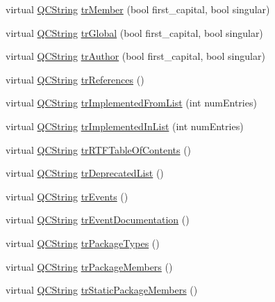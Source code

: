 \begin{DoxyCompactItemize}
\item 
virtual \hyperlink{class_q_c_string}{Q\-C\-String} \hyperlink{class_translator_portuguese_aaded5c915d8cd335abcd0e65e535cd71}{tr\-Member} (bool first\-\_\-capital, bool singular)
\item 
virtual \hyperlink{class_q_c_string}{Q\-C\-String} \hyperlink{class_translator_portuguese_ac9f8f800abe2f721d9cf0bdfc9b6ec6f}{tr\-Global} (bool first\-\_\-capital, bool singular)
\item 
virtual \hyperlink{class_q_c_string}{Q\-C\-String} \hyperlink{class_translator_portuguese_a8ce93b65c315fc4e942a1dc4cc80fa54}{tr\-Author} (bool first\-\_\-capital, bool singular)
\item 
virtual \hyperlink{class_q_c_string}{Q\-C\-String} \hyperlink{class_translator_portuguese_a54eaa9a933568bfd7eaffe36b7872eb0}{tr\-References} ()
\item 
virtual \hyperlink{class_q_c_string}{Q\-C\-String} \hyperlink{class_translator_portuguese_a01f548ba9f63fd42bc070ba1247e6543}{tr\-Implemented\-From\-List} (int num\-Entries)
\item 
virtual \hyperlink{class_q_c_string}{Q\-C\-String} \hyperlink{class_translator_portuguese_aa2aa7d2d195ce999a256e7769605c0f0}{tr\-Implemented\-In\-List} (int num\-Entries)
\item 
virtual \hyperlink{class_q_c_string}{Q\-C\-String} \hyperlink{class_translator_portuguese_aacd8ff5b2dcf79f4e8e72625d624a206}{tr\-R\-T\-F\-Table\-Of\-Contents} ()
\item 
virtual \hyperlink{class_q_c_string}{Q\-C\-String} \hyperlink{class_translator_portuguese_af7a7f1e3eaf6bc4c1026cfb73fbf486a}{tr\-Deprecated\-List} ()
\item 
virtual \hyperlink{class_q_c_string}{Q\-C\-String} \hyperlink{class_translator_portuguese_a43ec7331f50b74dc31b6d4e13879c93a}{tr\-Events} ()
\item 
virtual \hyperlink{class_q_c_string}{Q\-C\-String} \hyperlink{class_translator_portuguese_afb5c66237dd5bce42714ec9616a29887}{tr\-Event\-Documentation} ()
\item 
virtual \hyperlink{class_q_c_string}{Q\-C\-String} \hyperlink{class_translator_portuguese_a835fa6d7f51082a0d730d4759cbc5999}{tr\-Package\-Types} ()
\item 
virtual \hyperlink{class_q_c_string}{Q\-C\-String} \hyperlink{class_translator_portuguese_a595a1ba7b4f631a384b17e3c2084e271}{tr\-Package\-Members} ()
\item 
virtual \hyperlink{class_q_c_string}{Q\-C\-String} \hyperlink{class_translator_portuguese_a8f144cf1daf28327dec2fe32c7fcb020}{tr\-Static\-Package\-Members} ()

\end{DoxyCompactItemize}
